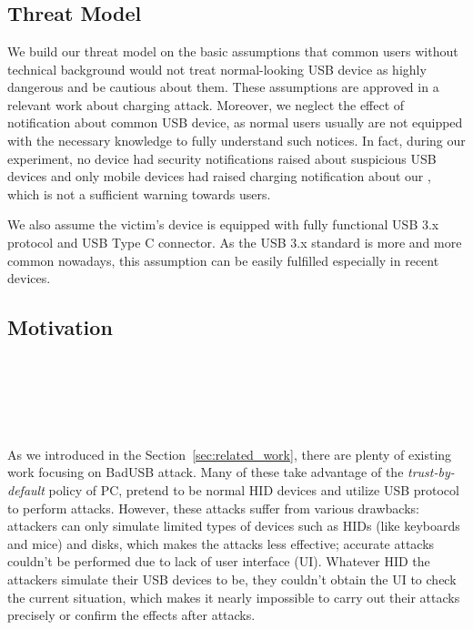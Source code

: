 \section{\tool}
\label{sec:badusb}
\subsection{Threat Model}
We build our threat model on the basic assumptions that common users without technical background would not treat normal-looking USB device as highly dangerous and be cautious about them. These assumptions are approved in a relevant work about charging attack\cite{JFCImpact}. Moreover, we neglect the effect of notification about common USB device, as normal users usually are not equipped with the necessary knowledge to fully understand such notices. In fact, during our experiment, no device had security notifications raised about suspicious USB devices and only mobile devices had raised charging notification about our \tool, which is not a sufficient warning towards users.

We also assume the victim's device is equipped with fully functional USB 3.x protocol and USB Type C connector. As the USB 3.x standard is more and more common nowadays, this assumption can be easily fulfilled especially in recent devices.
\subsection{Motivation}
\noindent{}\\
\\
\\
\\
\\
As we introduced in the Section~\ref{sec:related_work}, there are plenty of existing work  focusing on BadUSB attack. 
Many of these take advantage of the \textit{trust-by-default} policy of PC, pretend to be normal HID devices and utilize USB protocol to perform attacks. 
However, these attacks suffer from various drawbacks:
 attackers can only simulate limited types of devices such as HIDs (like keyboards and mice) and disks, which makes the attacks less effective;
 accurate attacks couldn't be performed due to lack of user interface (UI).
Whatever HID the attackers simulate their USB devices to be, they couldn't obtain the UI to check the current situation, which makes it nearly impossible to carry out their attacks precisely or confirm the effects after attacks.

